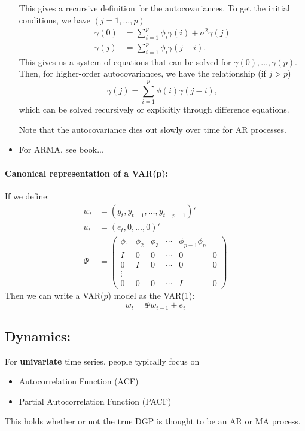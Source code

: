 \begin{itemize}
  This gives a recursive definition for the autocovariances. To get
  the initial conditions, we have $(j = 1,\dots,p)$
  \begin{align*}
    \gamma(0) &= \sum_{i=1}^p \phi_i \gamma(i) + \sigma^2 \gamma(j) \\
    \gamma(j) &= \sum_{i=1}^p \phi_i \gamma(j-i).
  \end{align*}
  This gives us a system of equations that can
  be solved for $\gamma(0),\dots,\gamma(p)$. Then, for higher-order autocovariances,
   we have the relationship (if $j > p$)
   \begin{equation*}
     \gamma(j) = \sum_{i=1}^p \phi(i) \gamma(j-i),
   \end{equation*}
   which can be solved recursively or explicitly through difference
   equations.

   Note that the autocovariance dies out slowly over time for AR
   processes.
 \item For ARMA, see book...
\end{itemize}

\paragraph{Canonical representation of a VAR(p):}
If we define:
\begin{align}
  w_t &= (y_t, y_{t-1}, \dots, y_{t-p+1})' \\
  u_t &= (e_t, 0, \dots, 0)' \\
  \Psi &= \begin{pmatrix}
    \phi_1 & \phi_2 & \phi_3 & \cdots & \phi_{p-1} \phi_p \\
    I & 0 & 0 & \cdots & 0 & 0 \\
    0 & I & 0 & \cdots & 0 & 0 \\
    \vdots \\
    0 & 0 & 0 & \cdots & I & 0
  \end{pmatrix}
\end{align}
Then we can write a VAR($p$) model as the VAR(1):
\[w_t = \Psi w_{t-1} + e_t\]

\subsection{Dynamics:}

For \textbf{univariate} time series, people typically focus on
\begin{itemize}
\item Autocorrelation Function (ACF)
\item Partial Autocorrelation Function (PACF)
\end{itemize}
This holds whether or not the true DGP is thought to be an AR or MA
process.

